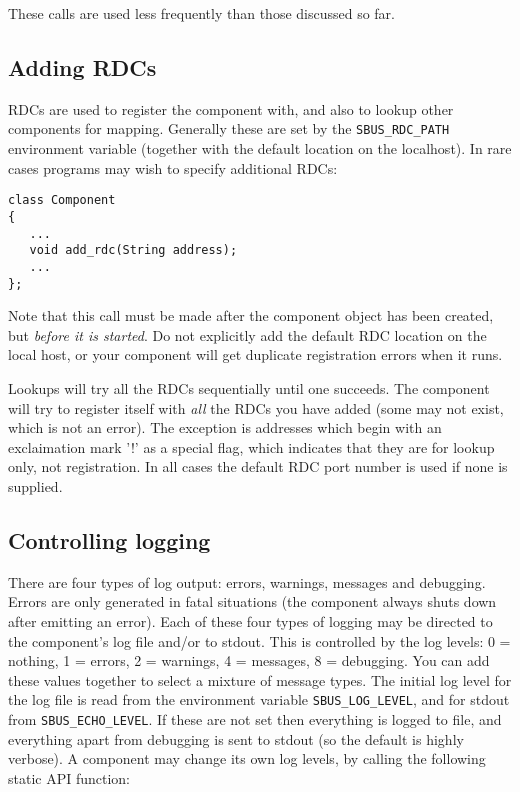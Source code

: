 \documentclass[12pt,a4paper,twoside]{article}
\renewcommand{\_}{\texttt{\symbol{95}}}
\begin{document}
These calls are used less frequently than those discussed so far.

\subsection{Adding RDCs}

RDCs are used to register the component with, and also to
lookup other components for mapping. Generally these are
set by the \verb^SBUS_RDC_PATH^ environment variable (together
with the default location on the localhost). In rare cases
programs may wish to specify additional RDCs:

\begin{verbatim}
class Component
{
   ...
   void add_rdc(String address);
   ...
};
\end{verbatim}

Note that this call must be made after the component object
has been created, but \textit{before it is started}.
Do not explicitly add the default RDC location on the local host,
or your component will get duplicate registration errors when it runs.

Lookups will try all the RDCs sequentially until one succeeds.
The component will try to register itself with \textit{all}
the RDCs you have added (some may not exist, which is not an error).
The exception is addresses which begin with an exclaimation mark '!'
as a special flag, which indicates that they are for lookup only,
not registration.
In all cases the default RDC port number is used if none is supplied.

\subsection{Controlling logging}

There are four types of log output: errors, warnings, messages and
debugging. Errors are only generated in fatal situations (the
component always shuts down after emitting an error). Each of
these four types of logging may be directed to the component's
log file and/or to stdout. This is controlled by the log levels:
0 = nothing, 1 = errors, 2 = warnings, 4 = messages, 8 = debugging.
You can add these values together to select a mixture of message types.
The initial log level for the log file is read from the environment
variable \verb^SBUS_LOG_LEVEL^, and for stdout from \verb^SBUS_ECHO_LEVEL^.
If these are not set then everything is logged to file, and everything apart
from debugging is sent to stdout (so the default is highly verbose).
A component may change its own log levels, by calling the following
static API function:
\end{document}
